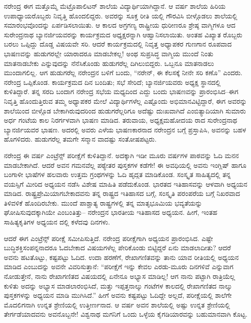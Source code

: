 ನರೇಂದ್ರ ಈಗ ಮತ್ತೊಮ್ಮೆ ಮೆಟ್ರೊಪಾಲಿಟನ್ ಶಾಲೆಯ ವಿದ್ಯಾರ್ಥಿಯಾಗಿದ್ದಾನೆ. ಆ ವರ್ಷ ಶಾಲೆಯ ಹಿರಿಯ ಉಪಾಧ್ಯಾಯರೊಬ್ಬರು ನಿವೃತ್ತಿ ಹೊಂದಲಿದ್ದರು. ಅವರನ್ನು ಸೂಕ್ತ ರೀತಿ ಯಲ್ಲಿ ಗೌರವಿಸಿ ಬೀಳ್ಗೊಡಲು ಶಾಲೆಯಲ್ಲಿ ಸಮಾರಂಭವೊಂದನ್ನು ಏರ್ಪಡಿಸಲಾಯಿತು. ಆ ಕಾಲದ ಅಗ್ರಗಣ್ಯ ರಾಷ್ಟ್ರೀಯ ಧುರೀಣರೂ ಶ್ರೇಷ್ಠ ವಾಗ್ಮಿಗಳೂ ಆದ ಸುರೇಂದ್ರನಾಥ ಬ್ಯಾನರ್ಜಿಯವರನ್ನು ಕಾರ್ಯಕ್ರಮದ ಅಧ್ಯಕ್ಷರನ್ನಾಗಿ ಆಹ್ವಾನಿಸಲಾಯಿತು. ಅಂತಹ ವಿಖ್ಯಾತ ರೊಬ್ಬರು ಬರಲು ಒಪ್ಪಿದ್ದು ದೊಡ್ಡ ವಿಷಯವೇ ಸರಿ. ಆದರೆ ಕಾರ್ಯಕ್ರಮದಲ್ಲಿ ನಿವೃತ್ತ ಅಧ್ಯಾಪಕರ ಗುಣಗಾನ ರೂಪವಾದ ಭಾಷಣವನ್ನು ಹುಡುಗರಲ್ಲೇ ಯಾರಾದರೂ ಮಾಡಬೇಕಲ್ಲ! ಅಂಥ ಸುಪ್ರಸಿದ್ಧ ವಾಗ್ಮಿಯ ಮುಂದೆ ನಿಂತು ಮಾತನಾಡಬೇಕು ಎನ್ನುವುದನ್ನು ನೆನೆಸಿಕೊಂಡು ಹುಡುಗರೆಲ್ಲ ದಿಗಿಲುಬಿದ್ದರು. ಒಬ್ಬನೂ ಮಾತನಾಡಲು ಮುಂದಾಗಲಿಲ್ಲ. ಆಗ ಹುಡುಗರೆಲ್ಲ ನರೇಂದ್ರನ ಬಳಿಗೆ ಬಂದು, “ನರೇನ್, ಈ ಕೆಲಸಕ್ಕೆ ನೀನೇ ಸರಿ ಕಣೊ” ಎಂದರು. ನರೇಂದ್ರ ಒಪ್ಪಿಕೊಂಡ. ಕಾರ್ಯಕ್ರಮದ ದಿನ ಬಂದಿತು; ಸಭೆ ಸೇರಿದೆ; ಬ್ಯಾನರ್ಜಿಯವರು ಅಧ್ಯಕ್ಷ ಸ್ಥಾನದಲ್ಲಿ ಕುಳಿತಿದ್ದಾರೆ. ತನ್ನ ಸರದಿ ಬಂದಾಗ ನರೇಂದ್ರ ಸಭೆಯ ಮಧ್ಯದಿಂದ ಎದ್ದು ಬಂದು ಭಾಷಣವನ್ನು ಪ್ರಾರಂಭಿಸಿದ–ಈಗ ನಿವೃತ್ತಿ ಹೊಂದುತ್ತಿರುವ ತಮ್ಮ ಅಧ್ಯಾಪಕರ ಮೇಲೆ ವಿದ್ಯಾರ್ಥಿಗಳೆಲ್ಲ ಎಷ್ಟೊಂದು ಅಭಿಮಾನವಿಟ್ಟಿದ್ದಾರೆ, ಈಗ ಅವರನ್ನು ಶಾಲೆಯಿಂದ ಬೀಳ್ಗೊಡ ಬೇಕಾಗಿರುವುದರಿಂದ ಹುಡುಗರೆಲ್ಲರಿಗೂ ಅದೆಷ್ಟು ದುಃಖವಾಗಿದೆ ಎಂಬಿತ್ಯಾದಿಯಾಗಿ ಸುಮಾರು ಅರ್ಧ ಗಂಟೆಯ ಕಾಲ ನಿರರ್ಗಳವಾಗಿ ಭಾಷಣ ಮಾಡಿದ. ತರುವಾಯ, ಅಧ್ಯಕ್ಷಮಹೋದಯ ರಾದ ಸುರೇಂದ್ರನಾಥ ಬ್ಯಾನರ್ಜಿಯವರ ಭಾಷಣ. ಅದರಲ್ಲಿ ಅವರು ಎಳೆಯ ಭಾಷಣಕಾರನಾದ ನರೇಂದ್ರನ ಬಗ್ಗೆ ಪ್ರಸ್ತಾಪಿಸಿ, ಅವನನ್ನು ಬಹಳ ಹೊಗಳಿದರು. ಹುಡುಗರೆಲ್ಲ ತಮಗೇ ಸನ್ಮಾನ ವಾದಷ್ಟು ಸಂತೋಷಪಟ್ಟರು.

ನರೇಂದ್ರ ಈ ವರ್ಷ ಎಂಟ್ರೆನ್ಸ್ ಪರೀಕ್ಷೆಗೆ ಕುಳಿತಿದ್ದಾನೆ. ಅದಕ್ಕಾಗಿ ಇಡೀ ಮೂರು ವರ್ಷಗಳ ಪಾಠವನ್ನು ಓದಿ ಮನನ ಮಾಡಬೇಕಾಗಿದೆ. ಆದರೆ ಅವನ ಗಮನವೆಲ್ಲ ಪಠ್ಯೇತರ ಪುಸ್ತಕಗಳ ಕಡೆಗೇ! ಈ ಅವಧಿಯಲ್ಲಿ ಅವನು ಇಂಗ್ಲಿಷ್ ಹಾಗೂ ಬಂಗಾಳೀ ಭಾಷೆಗಳ ಹಲವಾರು ಉತ್ತಮ ಗ್ರಂಥಗಳನ್ನು ಓದಿ ಹೃದ್ಗತ ಮಾಡಿಕೊಂಡ. ಸಂಸ್ಕೃತ ಸಾಹಿತ್ಯದಲ್ಲಿ ತನ್ನ ವಯಸ್ಸಿಗೆ ಮೀರಿದ ಅಧ್ಯಯನ ನಡೆಸಿ ವಿಶೇಷ ಮಾಹಿತಿ ಪಡೆದುಕೊಂಡ. ಭಾರತದ ಇತಿಹಾಸವನ್ನು ಆಳವಾಗಿ ಅಧ್ಯಯನ ಮಾಡಿದ. ರಾಷ್ಟ್ರಪ್ರೇಮಿಯಾಗಬೇಕಾದವನು ತನ್ನ ರಾಷ್ಟ್ರದ ಇತಿಹಾಸದ ಬಗ್ಗೆ, ಸಂಸ್ಕೃತಿ ಪರಂಪರೆಯ ಬಗ್ಗೆ ನಿಖರವಾದ ತಿಳಿವಳಿಕೆ ಹೊಂದಿರಬೇಕು. ಮುಂದೆ ಪಾಶ್ಚಾತ್ಯ ರಾಷ್ಟ್ರಗಳಲ್ಲಿ ತನ್ನ ಮಾತೃಭೂಮಿಯ ಭವ್ಯತೆಯನ್ನು ಘೋಷಿಸುವುದಕ್ಕಾಗಿಯೇ ಎಂಬಂತಿತ್ತು– ನರೇಂದ್ರನ ಭಾರತೀಯ ಇತಿಹಾಸದ ಅಧ್ಯಯನ. ಹೀಗೆ, ಇಂತಹ ಸಾಹಿತ್ಯಕೃತಿಗಳ ಅಧ್ಯಯನ ದಲ್ಲಿ ಕಳೆದವು ದಿನಗಳು.

ಆದರೆ ಈಗ ಎಂಟ್ರೆನ್ಸ್ ಪರೀಕ್ಷೆ ಸಮೀಪಿಸುತ್ತಿದೆ. ನರೇಂದ್ರ ಪರೀಕ್ಷೆಗಾಗಿ ಅಧ್ಯಯನ ಪ್ರಾರಂಭಿಸಿದ. ಎಷ್ಟೇ ಬುದ್ಧಿಶಕ್ತಿಸಂಪನ್ನನಾದರೂ ಓದಬೇಕಾದ ವಿಷಯಗಳೆಲ್ಲ ಪೇರಿಕೊಂಡು ಬಿಟ್ಟಿದ್ದರೆ ಏನು ಮಾಡಲಾದೀತು? ಆದರೆ ಅವನು ಹಟತೊಟ್ಟು, ಕಷ್ಟಪಟ್ಟು ಓದಿದ. ಉದಾ ಹರಣೆಗೆ, ರೇಖಾಗಣಿತವನ್ನು ತಾನು ಯಾವ ರೀತಿಯಲ್ಲಿ ಅಧ್ಯಯನ ಮಾಡಿದ ಎಂಬುದನ್ನು ಅವನೇ ವಿವರಿಸುತ್ತಾನೆ: “ಪರೀಕ್ಷೆಗೆ ಇನ್ನು ಕೇವಲ ಎರಡು-ಮೂರು ದಿನಗಳಿವೆ ಎನ್ನುವಾಗ ನೋಡುತ್ತೇನೆ, ನಾನು ರೇಖಾಗಣಿತದ ವಿಷಯದಲ್ಲಿ ಏನೇನೂ ಅಭ್ಯಾಸ ಮಾಡಿಲ್ಲ! ಆಗ ನಾನು ಪಟ್ಟಾಗಿ ರಾತ್ರಿಯೆಲ್ಲ ಕುಳಿತು ಅದನ್ನು ಅಭ್ಯಾಸ ಮಾಡಲಾರಂಭಿಸಿದೆ, ಮತ್ತು ಇಪ್ಪತ್ತನಾಲ್ಕು ಗಂಟೆಗಳ ಕಾಲದಲ್ಲಿ ರೇಖಾಗಣಿತದ ನಾಲ್ಕು ಪುಸ್ತಕಗಳನ್ನು ಅಧ್ಯಯನ ಮಾಡಿ ಮುಗಿಸಿದೆ.” ಹೀಗೆ ಅವನು ಕಷ್ಟಪಟ್ಟು ಓದಿದ್ದೇ ಅಲ್ಲದೆ, ಪರೀಕ್ಷೆಯಲ್ಲಿ ಶಾಲೆಗೇ ಮೊದಲಿಗನಾಗಿ ಉನ್ನತ ಶ್ರೇಣಿಯಲ್ಲಿ ಉತ್ತೀರ್ಣನಾದ. ಆ ವರ್ಷ ಅವನ ಶಾಲೆಯಲ್ಲಿ ಅಷ್ಟು ಉನ್ನತ ಶ್ರೇಣಿಯಲ್ಲಿ ತೇರ್ಗಡೆಯಾದವನು ಅವನೊಬ್ಬನೇ! ವಿಶ್ವನಾಥ ಮಗನಿಗೆ ಒಂದು ಒಳ್ಳೆಯ ಕೈಗಡಿಯಾರವನ್ನು ಬಹುಮಾನವಾಗಿ ಕೊಟ್ಟ.

